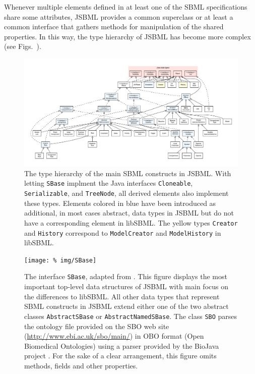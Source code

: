 \documentclass[
  BCOR12mm,
  letterpaper,
  11pt,
  headsepline,
  pointlessnumbers,
  tablecaptionabove,
  onelinecaption,
  headinclude,
  appendixprefix,
  idxtotoc,
  bibtotoc,
  twoside,
  titlepage
]{scrartcl}
\begin{document}
Whenever multiple elements defined in at least one of the SBML
specifications \citep{Hucka2003, Hucka2008, Hucka2010a} share some
attributes, JSBML provides a common superclass or at
least a common interface that gathers methods for manipulation of the shared
properties. In this way, the type hierarchy of JSBML has become more complex (see
Figs.~).
\begin{figure}
\centering
\includegraphics[width=\textwidth]{img/FullTypeHierarchy.pdf}
\caption[The type hierarchy of the main SBML
constructs in JSBML]{The type hierarchy of the main SBML
constructs in JSBML. With letting \texttt{SBase} implment the Java interfaces
\texttt{Cloneable}, \texttt{Serializable}, and \texttt{TreeNode}, all derived
elements also implement these types. Elements colored in blue have been
introduced as additional, in most cases abstract, data types in JSBML but do not
have a corresponding element in libSBML. The yellow types \texttt{Creator} and
\texttt{History} correspond to \texttt{ModelCreator} and \texttt{ModelHistory}
in libSBML.}
\label{fig:TypeHierarchy}
\end{figure}
\begin{figure}[htb]
 \centering
 \texttt{[image: \%
img/SBase]}
 \caption[The interface \texttt{SBase}]{The interface \texttt{SBase}, adapted
from \citep{Draeger2011}. This figure displays the most important top-level data
structures of JSBML with main focus on the differences to libSBML. All other
data types that represent SBML constructs in JSBML extend either one of the two
abstract classes \texttt{AbstractSBase} or \texttt{AbstractNamedSBase}. The
class \texttt{SBO} parses the ontology file provided on the SBO web
site (\url{http://www.ebi.ac.uk/sbo/main/}) in OBO format (Open
Biomedical Ontologies) using a parser provided by the BioJava project
\citep{Holland2008}. For the sake of a clear arrangement, this figure omits
methods, fields and other properties.}
 \label{fig:SBase}
\end{figure}
\end{document}
